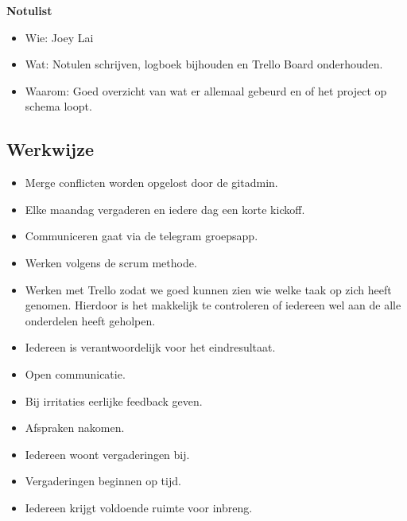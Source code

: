 \documentclass{uva-inf-article}
\begin{document}
\textbf{Notulist}
\begin{itemize}[noitemsep]
    \item Wie: Joey Lai
    \item Wat: Notulen schrijven, logboek bijhouden en Trello Board onderhouden.
    \item Waarom: Goed overzicht van wat er allemaal gebeurd en of het project op schema loopt.
\end{itemize}

\subsection{Werkwijze}
\begin{itemize}[noitemsep]
    \item Merge conflicten worden opgelost door de gitadmin.
    \item Elke maandag vergaderen en iedere dag een korte kickoff.
    \item Communiceren gaat via de telegram groepsapp.
    \item Werken volgens de scrum methode.
    \item Werken met Trello zodat we goed kunnen zien wie welke taak op zich heeft genomen. Hierdoor is het makkelijk te controleren of iedereen wel aan de alle onderdelen heeft geholpen.
    \item Iedereen is verantwoordelijk voor het eindresultaat.
    \item Open communicatie.
    \item Bij irritaties eerlijke feedback geven.
    \item Afspraken nakomen.
    \item Iedereen woont vergaderingen bij.
    \item Vergaderingen beginnen op tijd.
    \item Iedereen krijgt voldoende ruimte voor inbreng.
\end{itemize}

\end{document}
